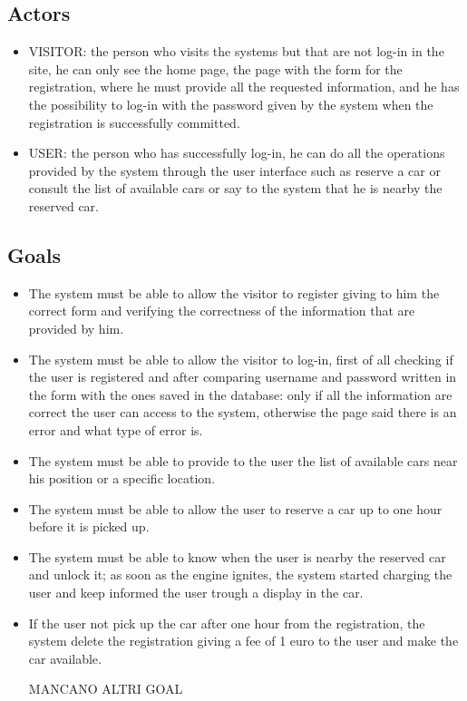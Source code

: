 \subsection{Actors} \label{subsec:actors}
\begin{itemize}
\item VISITOR: the person who visits the systems but that are not log-in in the site, he can only see the home page, the page with the form for the registration, where he must provide all the requested information, and he has the possibility to log-in with the password given by the system when the registration is successfully committed. 
\item USER: the person who has successfully log-in, he can do all the operations provided by the system through the user interface such as reserve a car or consult the list of available cars or say to the system that he is nearby the reserved car. 
\end{itemize}

\subsection{Goals} \label{subsec:goals}
\begin{itemize}
\item The system must be able to allow the visitor to register giving to him the correct form and verifying the correctness of the information that are provided by him.
\item The system must be able to allow the visitor to log-in, first of all checking if the user is registered and after comparing username and password written in the form with the ones saved in the database: only if all the information are correct the user can access to the system, otherwise the page said there is an error and what type of error is.
\item The system must be able to provide to the user the list of available cars near his position or a specific location.
\item The system must be able to allow the user to reserve a car up to one hour before it is picked up.
\item The system must be able to know when the user is nearby the reserved car and unlock it; as soon as the engine ignites, the system started charging the user and keep informed the user trough a display in the car.
\item If the user not pick up the car after one hour from the registration, the system delete the registration giving a fee of 1 euro to the user and make the car available.

MANCANO ALTRI GOAL

\end{itemize}


